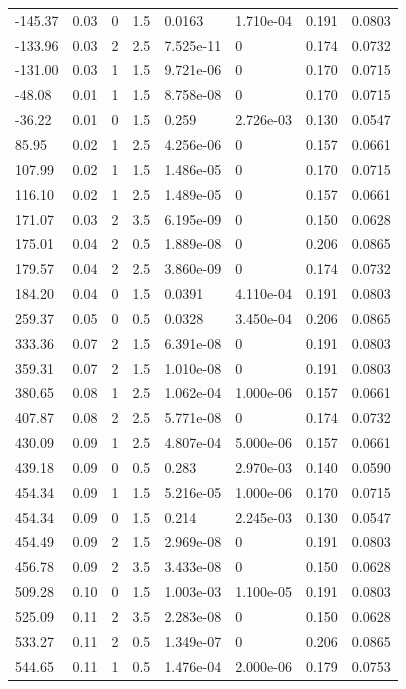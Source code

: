\documentclass[preview]{standalone}
\begin{document}
{{\begin{tabular}{L{1.2cm}C{1.2cm} C{0.3cm}C{0.5cm} C{1.4cm}C{1.4cm} C{1.4cm}C{1.4cm}}
  -145.37  &  0.03  & 0     & 1.5 &  0.0163  & 1.710e-04  & 0.191 &  0.0803   \\ 
  -133.96  &  0.03  & 2     & 2.5 &  7.525e-11  & 0  & 0.174 &  0.0732   \\ 
  -131.00  &  0.03  & 1     & 1.5 &  9.721e-06  & 0  & 0.170 &  0.0715   \\ 
  -48.08  &  0.01  & 1     & 1.5 &  8.758e-08  & 0  & 0.170 &  0.0715   \\ 
  -36.22  &  0.01  & 0     & 1.5 &  0.259  & 2.726e-03  & 0.130 &  0.0547   \\ 
  85.95  &  0.02  & 1     & 2.5 &  4.256e-06  & 0  & 0.157 &  0.0661   \\ 
  107.99  &  0.02  & 1     & 1.5 &  1.486e-05  & 0  & 0.170 &  0.0715   \\ 
  116.10  &  0.02  & 1     & 2.5 &  1.489e-05  & 0  & 0.157 &  0.0661   \\ 
  171.07  &  0.03  & 2     & 3.5 &  6.195e-09  & 0  & 0.150 &  0.0628   \\ 
  175.01  &  0.04  & 2     & 0.5 &  1.889e-08  & 0  & 0.206 &  0.0865   \\ 
  179.57  &  0.04  & 2     & 2.5 &  3.860e-09  & 0  & 0.174 &  0.0732   \\ 
  184.20  &  0.04  & 0     & 1.5 &  0.0391  & 4.110e-04  & 0.191 &  0.0803   \\ 
  259.37  &  0.05  & 0     & 0.5 &  0.0328  & 3.450e-04  & 0.206 &  0.0865   \\ 
  333.36  &  0.07  & 2     & 1.5 &  6.391e-08  & 0  & 0.191 &  0.0803   \\ 
  359.31  &  0.07  & 2     & 1.5 &  1.010e-08  & 0  & 0.191 &  0.0803   \\ 
  380.65  &  0.08  & 1     & 2.5 &  1.062e-04  & 1.000e-06  & 0.157 &  0.0661   \\ 
  407.87  &  0.08  & 2     & 2.5 &  5.771e-08  & 0  & 0.174 &  0.0732   \\ 
  430.09  &  0.09  & 1     & 2.5 &  4.807e-04  & 5.000e-06  & 0.157 &  0.0661   \\ 
  439.18  &  0.09  & 0     & 0.5 &  0.283  & 2.970e-03  & 0.140 &  0.0590   \\ 
  454.34  &  0.09  & 1     & 1.5 &  5.216e-05  & 1.000e-06  & 0.170 &  0.0715   \\ 
  454.34  &  0.09  & 0     & 1.5 &  0.214  & 2.245e-03  & 0.130 &  0.0547   \\ 
  454.49  &  0.09  & 2     & 1.5 &  2.969e-08  & 0  & 0.191 &  0.0803   \\ 
  456.78  &  0.09  & 2     & 3.5 &  3.433e-08  & 0  & 0.150 &  0.0628   \\ 
  509.28  &  0.10  & 0     & 1.5 &  1.003e-03  & 1.100e-05  & 0.191 &  0.0803   \\ 
  525.09  &  0.11  & 2     & 3.5 &  2.283e-08  & 0  & 0.150 &  0.0628   \\ 
  533.27  &  0.11  & 2     & 0.5 &  1.349e-07  & 0  & 0.206 &  0.0865   \\ 
  544.65  &  0.11  & 1     & 0.5 &  1.476e-04  & 2.000e-06  & 0.179 &  0.0753   \\ 
\hline 
\end{tabular} 

}}
\end{document}
